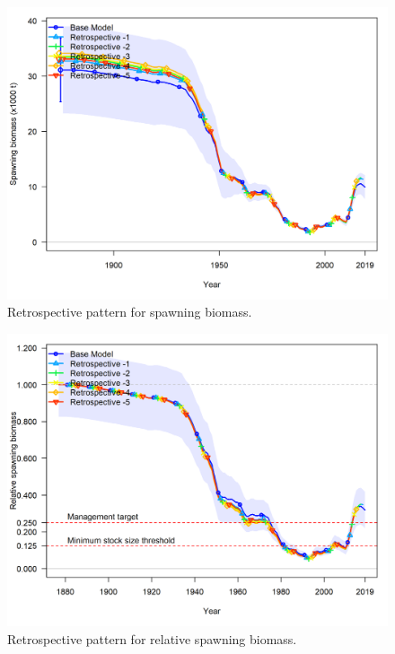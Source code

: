 \documentclass[12pt,]{article}
\begin{document}
\FloatBarrier

\begin{figure}
\centering
\includegraphics{Figures/retro_ssb.png}
\caption{Retrospective pattern for spawning biomass.
\label{fig:retro_ssb}}
\end{figure}

\FloatBarrier

\begin{figure}
\centering
\includegraphics{Figures/retro_depl.png}
\caption{Retrospective pattern for relative spawning biomass.
\label{fig:retro_depl}}
\end{figure}

\FloatBarrier
\end{document}
